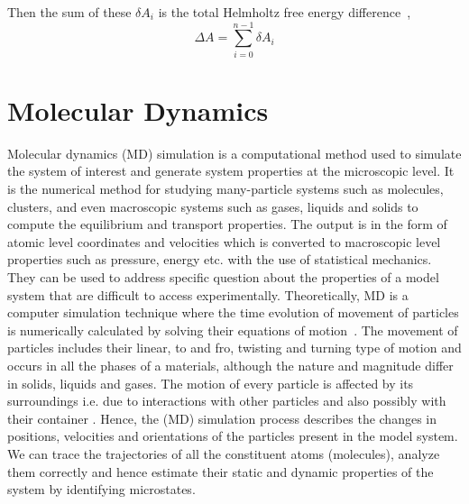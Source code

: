    Then the sum of these $\delta A_i$  is the total Helmholtz free energy difference~\citep{bennett1976}, 
   \begin{equation}
   \Delta A = \sum_{i=0}^{n-1} \delta A_i 
   \end{equation} 
       
\section{Molecular Dynamics}

Molecular dynamics (MD) simulation  is a computational method  used to simulate the system of interest and generate system properties at the microscopic level. It is the numerical method for studying many-particle systems such as molecules, clusters, and even macroscopic systems such as gases, liquids and solids to compute the equilibrium and transport properties.  The output is in the form of atomic level coordinates and velocities which is converted to macroscopic level properties such as pressure,
energy etc. with the use of statistical mechanics. They can be used to address specific question about the properties of a model system that are difficult to access experimentally. Theoretically, MD is a computer simulation technique where the time evolution of movement of particles  is numerically calculated by solving their equations of motion~\citep{Allen1989, Frenkel2002}. The movement of particles includes their linear, to and fro, twisting and turning type of motion and occurs in all the phases of a materials, although the nature and magnitude differ in solids, liquids and gases. The motion of every particle is affected by its surroundings i.e. due to interactions with other particles and also possibly with their container \citep{Haile1992}. Hence, the (MD) simulation process describes the changes in positions, velocities and orientations of the particles present in the model system. We can trace the trajectories of all the constituent atoms (molecules), analyze them correctly and hence estimate their static and dynamic properties of the  system by identifying microstates. 

